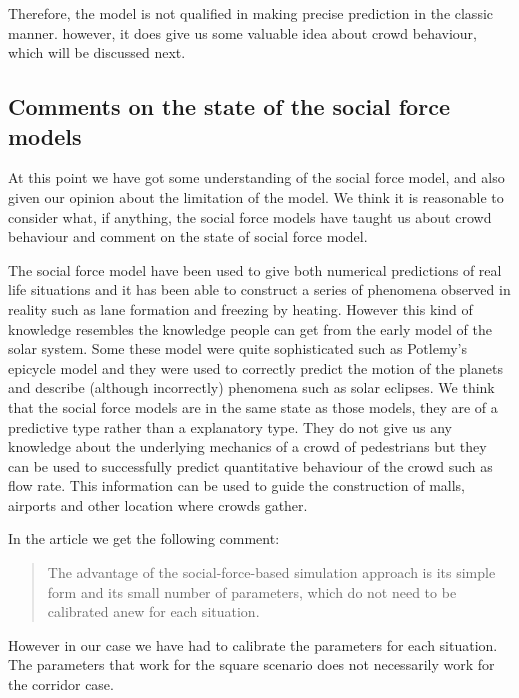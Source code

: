 Therefore, the model is not qualified in making precise prediction in the classic 
manner. however, it does give us some valuable idea about crowd behaviour, which 
will be discussed next.

\subsection{Comments on the state of the social force models}
At this point we have got some understanding of the social force model, and 
also given our opinion about the limitation of the model. We think it is 
reasonable to consider what, if anything, the social force models have taught 
us about crowd behaviour and comment on the state of social force model. 

The social force model have been used to give both numerical predictions of 
real life situations and it has been able to construct a series of phenomena 
observed in reality such as lane formation and freezing by heating.
However this kind of knowledge resembles the knowledge people can get from 
the early model of the solar system. Some these model were quite sophisticated 
such as Potlemy's epicycle model and they were used to correctly predict the 
motion of the planets and describe (although incorrectly) phenomena such as 
solar eclipses.
We think that the social force models are in the same state as those models, 
they are of a predictive type rather than a explanatory type. They do not give 
us any knowledge about the underlying mechanics of a crowd of pedestrians but 
they can be used to successfully predict quantitative behaviour of the crowd such 
as flow rate. This information can be used to guide the construction of malls, 
airports and other location where crowds gather.

In the article \cite{self-org}  we get the following comment:

\begin{quote}
	The advantage of the social-force-based simulation
	approach is its simple form and its small number of
	parameters, which do not need to be calibrated anew
	for each situation.
\end{quote}

However in our case we have had to calibrate the parameters for each 
situation. The parameters that work for the square scenario does not 
necessarily work for the corridor case.  


